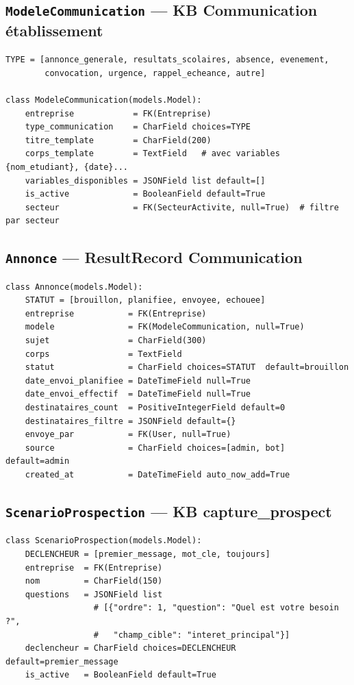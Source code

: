 \documentclass[11pt,a4paper]{article}
\newcommand{\slug}[1]{\texttt{\color{AGTDark}#1}}
\begin{document}
\subsection{\slug{ModeleCommunication} — KB Communication établissement}

\begin{lstlisting}
TYPE = [annonce_generale, resultats_scolaires, absence, evenement,
        convocation, urgence, rappel_echeance, autre]

class ModeleCommunication(models.Model):
    entreprise            = FK(Entreprise)
    type_communication    = CharField choices=TYPE
    titre_template        = CharField(200)
    corps_template        = TextField   # avec variables {nom_etudiant}, {date}...
    variables_disponibles = JSONField list default=[]
    is_active             = BooleanField default=True
    secteur               = FK(SecteurActivite, null=True)  # filtre par secteur
\end{lstlisting}

\subsection{\slug{Annonce} — ResultRecord Communication}

\begin{lstlisting}
class Annonce(models.Model):
    STATUT = [brouillon, planifiee, envoyee, echouee]
    entreprise           = FK(Entreprise)
    modele               = FK(ModeleCommunication, null=True)
    sujet                = CharField(300)
    corps                = TextField
    statut               = CharField choices=STATUT  default=brouillon
    date_envoi_planifiee = DateTimeField null=True
    date_envoi_effectif  = DateTimeField null=True
    destinataires_count  = PositiveIntegerField default=0
    destinataires_filtre = JSONField default={}
    envoye_par           = FK(User, null=True)
    source               = CharField choices=[admin, bot]  default=admin
    created_at           = DateTimeField auto_now_add=True
\end{lstlisting}

\subsection{\slug{ScenarioProspection} — KB capture\_prospect}

\begin{lstlisting}
class ScenarioProspection(models.Model):
    DECLENCHEUR = [premier_message, mot_cle, toujours]
    entreprise  = FK(Entreprise)
    nom         = CharField(150)
    questions   = JSONField list
                  # [{"ordre": 1, "question": "Quel est votre besoin ?",
                  #   "champ_cible": "interet_principal"}]
    declencheur = CharField choices=DECLENCHEUR  default=premier_message
    is_active   = BooleanField default=True
\end{lstlisting}
\end{document}
